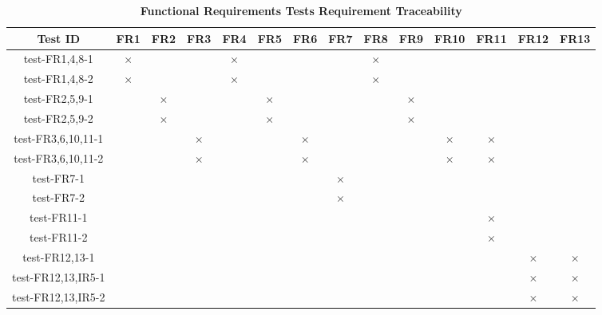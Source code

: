 \documentclass[12pt, titlepage]{article}
\begin{document}
\begin{landscape}
\begin{table}[H]
  \centering
  \begin{tabular}{|c|c|c|c|c|c|c|c|c|c|c|c|c|c|}
  \hline
   Test ID & FR1 & FR2 & FR3 & FR4 & FR5 & FR6 & FR7 & FR8 & FR9 & FR10 & FR11 & FR12 & FR13 \\
  \hline
  test-FR1,4,8-1 & $\times$ & & & $\times$ & & & & $\times$ & & & & & \\
  \hline
  test-FR1,4,8-2 & $\times$ & & & $\times$ & & & & $\times$ & & & & & \\
  \hline
  test-FR2,5,9-1 & & $\times$ & & & $\times$ & & & & $\times$ & & & & \\
  \hline
  test-FR2,5,9-2 & & $\times$ & & & $\times$ & & & & $\times$ & & & & \\
  \hline
  test-FR3,6,10,11-1 & & & $\times$ & & & $\times$ & & & & $\times$ & $\times$ & & \\
  \hline
  test-FR3,6,10,11-2 & & & $\times$ & & & $\times$ & & & & $\times$ & $\times$ & & \\
  \hline
  test-FR7-1 & & & & & & & $\times$ & & & & & & \\
  \hline
  test-FR7-2 & & & & & & & $\times$ & & & & & & \\
  \hline
  test-FR11-1 & & & & & & & & & & & $\times$ & & \\
  \hline
  test-FR11-2 & & & & & & & & & & & $\times$ & & \\
  \hline
  test-FR12,13-1 & & & & & & & & & & & & $\times$ & $\times$ \\
  \hline
  test-FR12,13,IR5-1 & & & & & & & & & & & & $\times$ & $\times$ \\
  \hline
  test-FR12,13,IR5-2 & & & & & & & & & & & & $\times$ & $\times$ \\
  \hline
\end{tabular}
\caption{\bf Functional Requirements Tests Requirement Traceability} \label{tab:fr-test-traceability}
\end{table}

\end{landscape}
\newpage
\end{document}
